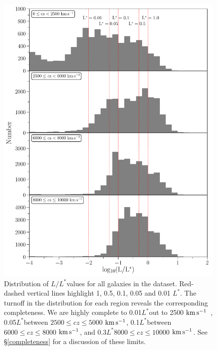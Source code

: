 \documentclass[twocolumn,tighten]{aastex62}
\newcommand{\Lstar}{$L^*$}
\newcommand{\kms}{$\rm km\, s^{-1}$}
\begin{document}
\begin{figure}[b!]
        \centering
        \vspace{0pt}
        \includegraphics[width=0.99\columnwidth]{Lstar_histogram_4bins_final_0-10000_v3_vert_flag0.pdf}
        \caption{\small{Distribution of $L/$\Lstar values  for all galaxies in the dataset. Red-dashed vertical lines highlight 1, 0.5, 0.1, 0.05 and 0.01 \Lstar. The turnoff in the distribution for each region reveals the corresponding completeness. We are highly complete to 0.01\Lstar out to 2500 \kms~, 0.05\Lstar between $2500 \leq cz \leq 5000$ \kms, 0.1\Lstar between $6000 \leq cz \leq 8000$ \kms, and 0.3\Lstar $8000 \leq cz \leq 10000$ \kms. See \S \ref{completeness} for a discussion of these limits.}}
        \vspace{5pt}
        \label{completeness_plot}
\end{figure} 
\end{document}
